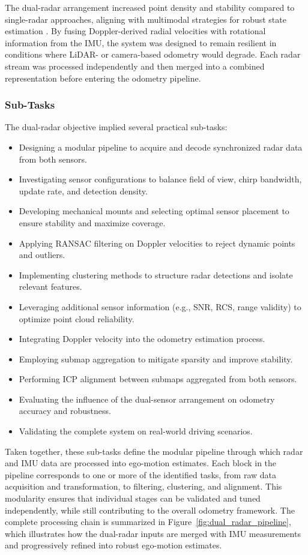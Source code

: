 The dual-radar arrangement increased point density and stability compared to single-radar approaches, aligning with multimodal strategies for robust state estimation \cite{Multimodal_Offroad,HighSpeed_Estimation}.  
By fusing Doppler-derived radial velocities with rotational information from the IMU, the system was designed to remain resilient in conditions where LiDAR- or camera-based odometry would degrade.  
Each radar stream was processed independently and then merged into a combined representation before entering the odometry pipeline.  

\subsubsection{Sub-Tasks}
The dual-radar objective implied several practical sub-tasks:  
\begin{itemize}
    \item Designing a modular pipeline to acquire and decode synchronized radar data from both sensors.  
    \item Investigating sensor configurations to balance field of view, chirp bandwidth, update rate, and detection density.  
    \item Developing mechanical mounts and selecting optimal sensor placement to ensure stability and maximize coverage.  
    \item Applying RANSAC filtering on Doppler velocities to reject dynamic points and outliers.  
    \item Implementing clustering methods to structure radar detections and isolate relevant features.  
    \item Leveraging additional sensor information (e.g., SNR, RCS, range validity) to optimize point cloud reliability.  
    \item Integrating Doppler velocity into the odometry estimation process.  
    \item Employing submap aggregation to mitigate sparsity and improve stability.  
    \item Performing ICP alignment between submaps aggregated from both sensors.  
    \item Evaluating the influence of the dual-sensor arrangement on odometry accuracy and robustness.  
    \item Validating the complete system on real-world driving scenarios.  
\end{itemize}

Taken together, these sub-tasks define the modular pipeline through which radar and IMU data are processed into ego-motion estimates.  
Each block in the pipeline corresponds to one or more of the identified tasks, from raw data acquisition and transformation, to filtering, clustering, and alignment.  
This modularity ensures that individual stages can be validated and tuned independently, while still contributing to the overall odometry framework.  
The complete processing chain is summarized in Figure~\ref{fig:dual_radar_pipeline}, which illustrates how the dual-radar inputs are merged with IMU measurements and progressively refined into robust ego-motion estimates.

